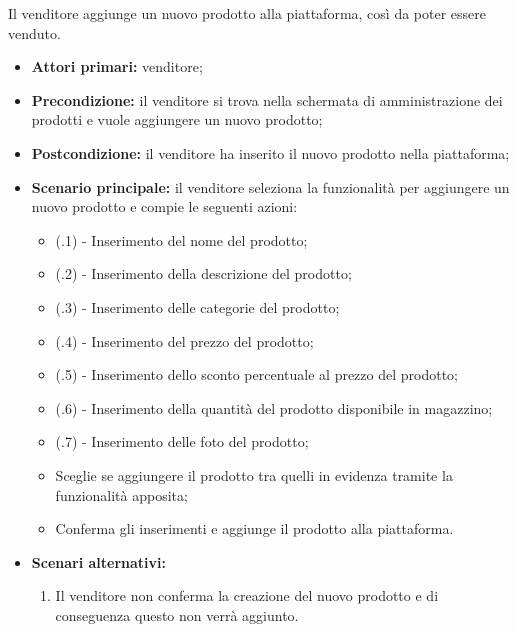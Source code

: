 Il venditore aggiunge un nuovo prodotto alla piattaforma, così da poter essere venduto.
\begin{itemize}
    \item \textbf{Attori primari:} venditore;
    \item \textbf{Precondizione:} il venditore si trova nella schermata di amministrazione dei prodotti e vuole aggiungere un nuovo prodotto;
    \item \textbf{Postcondizione:} il venditore ha inserito il nuovo prodotto nella piattaforma;
    \item \textbf{Scenario principale:} il venditore seleziona la funzionalità per aggiungere un nuovo prodotto e compie le seguenti azioni:
    \begin{itemize}
        \item (\actualUC.1) - Inserimento del nome del prodotto;
        \item (\actualUC.2) - Inserimento della descrizione del prodotto;
        \item (\actualUC.3) - Inserimento delle categorie del prodotto;
        \item (\actualUC.4) - Inserimento del prezzo del prodotto;
        \item (\actualUC.5) - Inserimento dello sconto percentuale al prezzo del prodotto;
        \item (\actualUC.6) - Inserimento della quantità del prodotto disponibile in magazzino;
        \item (\actualUC.7) - Inserimento delle foto del prodotto;
        \item Sceglie se aggiungere il prodotto tra quelli in evidenza tramite la funzionalità apposita;
        \item Conferma gli inserimenti e aggiunge il prodotto alla piattaforma.
    \end{itemize}
    \item \textbf{Scenari alternativi:}
	\begin{enumerate}[label=\lett]
		\item Il venditore non conferma la creazione del nuovo prodotto e di conseguenza questo non verrà aggiunto.
	\end{enumerate}
\end{itemize}

